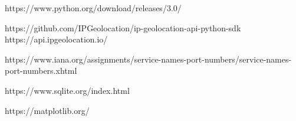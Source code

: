\begin{thebibliography}{9}

https://www.python.org/download/releases/3.0/

https://github.com/IPGeolocation/ip-geolocation-api-python-sdk
https://api.ipgeolocation.io/

https://www.iana.org/assignments/service-names-port-numbers/service-names-port-numbers.xhtml

https://www.sqlite.org/index.html

https://matplotlib.org/

\end{thebibliography}